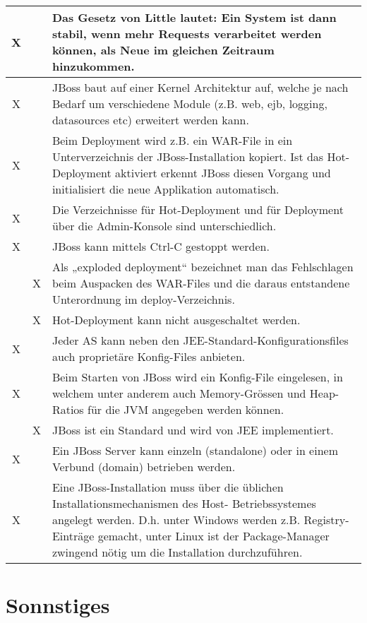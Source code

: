 \documentclass[a4paper,10pt]{scrreprt}
\begin{document}
\begin{tabular}{|c|c|p{12cm}|}
X & & Das Gesetz von Little lautet: Ein System ist dann stabil, wenn mehr Requests verarbeitet werden
können, als Neue im gleichen Zeitraum hinzukommen.\\ \hline
X & & JBoss baut auf einer Kernel Architektur auf, welche je nach Bedarf um verschiedene Module (z.B.
web, ejb, logging, datasources etc) erweitert werden kann. \\ \hline
X & & Beim Deployment wird z.B. ein WAR-File in ein Unterverzeichnis der JBoss-Installation kopiert. Ist
das Hot-Deployment aktiviert erkennt JBoss diesen Vorgang und initialisiert die neue Applikation
automatisch. \\ \hline
X & & Die Verzeichnisse für Hot-Deployment und für Deployment über die Admin-Konsole sind
unterschiedlich. \\ \hline
X & & JBoss kann mittels Ctrl-C gestoppt werden.\\ \hline
& X & Als „exploded deployment“ bezeichnet man das Fehlschlagen beim Auspacken des WAR-Files
und die daraus entstandene Unterordnung im deploy-Verzeichnis.\\ \hline
&X& Hot-Deployment kann nicht ausgeschaltet werden.\\ \hline
X & & Jeder AS kann neben den JEE-Standard-Konfigurationsfiles auch proprietäre Konfig-Files
anbieten. \\ \hline
X & & Beim Starten von JBoss wird ein Konfig-File eingelesen, in welchem unter anderem auch
Memory-Grössen und Heap-Ratios für die JVM angegeben werden können.\\ \hline
&X& JBoss ist ein Standard und wird von JEE implementiert.\\ \hline
X & & Ein JBoss Server kann einzeln (standalone) oder in einem Verbund (domain) betrieben werden.\\ \hline
X & & Eine JBoss-Installation muss über die üblichen Installationsmechanismen des Host-
Betriebssystemes angelegt werden. D.h. unter Windows werden z.B. Registry-Einträge gemacht,
unter Linux ist der Package-Manager zwingend nötig um die Installation durchzuführen. \\ \hline

\end{tabular}
\section{Sonnstiges} %
\label{sec:sonnstiges}
\end{document}
